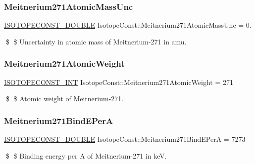 \subsubsection{\texorpdfstring{Meitnerium271\+Atomic\+Mass\+Unc}{Meitnerium271AtomicMassUnc}}
{\footnotesize\ttfamily \mbox{\hyperlink{group___isotope_const-_macros_ga8f45a7272ce02c0b4c65c44636ed719a}{I\+S\+O\+T\+O\+P\+E\+C\+O\+N\+S\+T\+\_\+\+D\+O\+U\+B\+LE}} Isotope\+Const\+::\+Meitnerium271\+Atomic\+Mass\+Unc = 0.}

\$ \$ Uncertainty in atomic mass of Meitnerium-\/271 in amu. \mbox{\label{group___isotope_const-_meitnerium-_mt271_ga18cd88b93f7f2c36ce992b8325288525}} 
\subsubsection{\texorpdfstring{Meitnerium271\+Atomic\+Weight}{Meitnerium271AtomicWeight}}
{\footnotesize\ttfamily \mbox{\hyperlink{group___isotope_const-_macros_ga5f18360b3e99483a35c32d789e62621c}{I\+S\+O\+T\+O\+P\+E\+C\+O\+N\+S\+T\+\_\+\+I\+NT}} Isotope\+Const\+::\+Meitnerium271\+Atomic\+Weight = 271}

\$ \$ Atomic weight of Meitnerium-\/271. \mbox{\label{group___isotope_const-_meitnerium-_mt271_ga3e702aa0035aa4eec5ebd7353d0d01fe}} 
\subsubsection{\texorpdfstring{Meitnerium271\+Bind\+E\+PerA}{Meitnerium271BindEPerA}}
{\footnotesize\ttfamily \mbox{\hyperlink{group___isotope_const-_macros_ga8f45a7272ce02c0b4c65c44636ed719a}{I\+S\+O\+T\+O\+P\+E\+C\+O\+N\+S\+T\+\_\+\+D\+O\+U\+B\+LE}} Isotope\+Const\+::\+Meitnerium271\+Bind\+E\+PerA = 7273}

\$ \$ Binding energy per A of Meitnerium-\/271 in keV. \mbox{\label{group___isotope_const-_meitnerium-_mt271_ga34de78dcb537f86196505b0a58bb9ba8}} 
